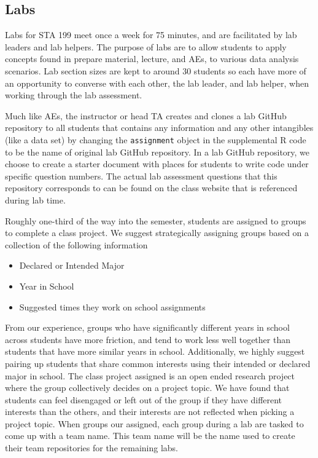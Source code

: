 \documentclass[
  12pt]{article}
\begin{document}
\hypertarget{labs}{%
\subsection{Labs}\label{labs}}

Labs for STA 199 meet once a week for 75 minutes, and are facilitated by
lab leaders and lab helpers. The purpose of labs are to allow students
to apply concepts found in prepare material, lecture, and AEs, to
various data analysis scenarios. Lab section sizes are kept to around 30
students so each have more of an opportunity to converse with each
other, the lab leader, and lab helper, when working through the lab
assessment.

Much like AEs, the instructor or head TA creates and clones a lab GitHub
repository to all students that contains any information and any other
intangibles (like a data set) by changing the \texttt{assignment} object
in the supplemental R code to be the name of original lab GitHub
repository. In a lab GitHub repository, we choose to create a starter
document with places for students to write code under specific question
numbers. The actual lab assessment questions that this repository
corresponds to can be found on the class website that is referenced
during lab time.

Roughly one-third of the way into the semester, students are assigned to
groups to complete a class project. We suggest strategically assigning
groups based on a collection of the following information

\begin{itemize}
\item
  Declared or Intended Major
\item
  Year in School
\item
  Suggested times they work on school assignments
\end{itemize}

From our experience, groups who have significantly different years in
school across students have more friction, and tend to work less well
together than students that have more similar years in school.
Additionally, we highly suggest pairing up students that share common
interests using their intended or declared major in school. The class
project assigned is an open ended research project where the group
collectively decides on a project topic. We have found that students can
feel disengaged or left out of the group if they have different
interests than the others, and their interests are not reflected when
picking a project topic. When groups our assigned, each group during a
lab are tasked to come up with a team name. This team name will be the
name used to create their team repositories for the remaining labs.
\end{document}
